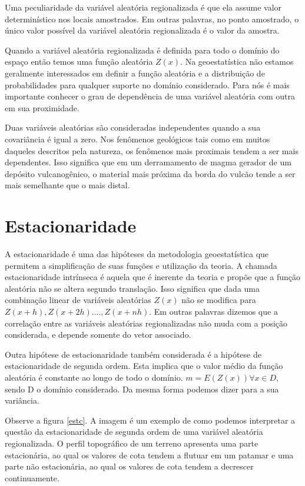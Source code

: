 Uma peculiaridade da variável aleatória regionalizada é que ela assume valor determinístico nos locais amostrados. Em outras palavras, no ponto amostrado, o único valor possível da variável aleatória regionalizada é o valor da amostra. 

Quando a variável aleatória regionalizada é definida para todo o domínio do espaço então temos uma função aleatória $Z(x)$. Na geoestatística não estamos geralmente interessados em definir a função aleatória e a distribuição de probabilidades para qualquer suporte no domínio considerado. Para nós é mais importante conhecer o grau de dependência de uma variável aleatória com outra em sua proximidade. 

Duas variáveis aleatórias são consideradas independentes quando a sua covariância é igual a zero. Nos fenômenos geológicos tais como em muitos daqueles descritos pela natureza, os fenômenos mais proximais tendem a ser mais dependentes. Isso significa que em um derramamento de magma gerador de um depósito vulcanogênico, o material mais próxima da borda do vulcão tende a ser mais semelhante que o mais distal. 

\section{Estacionaridade}

A estacionaridade é uma das hipóteses da metodologia geoestatística que permitem a simplificação de suas funções e utilização da teoria. A chamada estacionaridade intrínseca é aquela que é inerente da teoria e propõe que a função aleatória não se altera segundo translação. Isso significa que dada uma combinação linear de variáveis aleatórias $Z(x)$ não se modifica para $Z(x+h), Z(x+2h) ...., Z(x+nh)$. Em outras palavras dizemos que a correlação entre as variáveis aleatórias regionalizadas não muda com a posição considerada, e depende somente do vetor associado. 

Outra hipótese de estacionaridade também considerada é a hipótese de estacionaridade de segunda ordem. Esta implica que o valor médio da função aleatória é constante ao longo de todo o domínio. $ m = E(Z(x)) \forall x \in D$, sendo D o domínio considerado. Da mesma forma podemos dizer para a sua variância. 

Observe a figura \eqref{estc}. A imagem é um exemplo de como podemos interpretar a questão da estacionaridade de segunda ordem de uma variável aleatória regionalizada. O perfil topográfico de um terreno apresenta uma parte estacionária, ao qual os valores de cota tendem a flutuar em um patamar e uma parte não estacionária, ao qual os valores de cota tendem a decrescer continuamente. 

